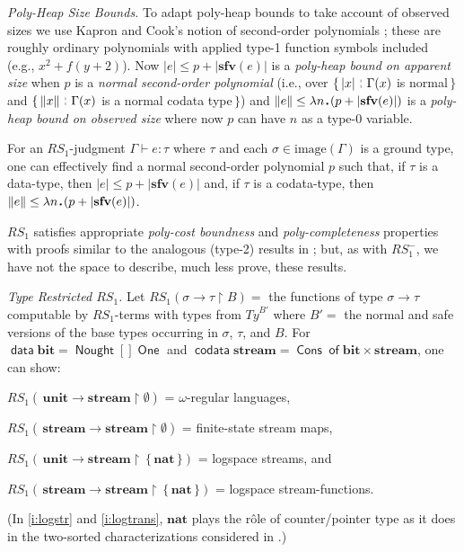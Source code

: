 \documentclass[envcountsame]{llncs}
\newcommand{\sfv}{\ensuremath{\mathbf{sfv}}}\newcommand{\ssize}[1]{\Vert #1\Vert}
\newcommand{\key}[1]{\ensuremath{\mathop{\mathsf{#1}}\nolimits}\xspace}
\newcommand{\Of}{\key{of}}
\newcommand{\type}[1]{\ensuremath{\mathbf{#1}}\xspace}
\newcommand{\Nat}{\type{nat}}
\newcommand{\Bit}{\type{bit}}
\newcommand{\Stream}{\type{stream}}
\newcommand{\Unit}{\ensuremath{\mathbf{unit}}\xspace}
\newcommand{\alt}{\mathrel{[\!]}}
\newcommand{\Ty}{\mathit{Ty}}
\newcommand{\constr}[1]{\ensuremath{\mathop{\mathsf{#1}}\nolimits}\xspace}
\newcommand{\Nought}{\constr{Nought}}
\newcommand{\One}{\constr{One}}
\newcommand{\data}{\constr{data}}
\newcommand{\codata}{\constr{codata}}
\newcommand{\Cons}{\constr{Cons}}
\newcommand{\asize}[1]{\ensuremath{\mathopen{|}#1\mathclose{|}}\xspace}
\newcommand{\osize}[1]{\ensuremath{\mathopen{\Vert}#1\mathclose{\Vert}}}
\newcommand{\RS}{\mathit{RS}}
\newcommand{\RSi}{\mathit{RS_1}}
\newcommand{\RSmi}{\mathit{RS^-_1}}
\newcommand{\confined}{\mathclose{\upharpoonright}}
\newcommand{\image}{\mathrm{image}}
\newcommand{\set}[1]{\{\,#1\,\}}
\newcommand{\entails}{\vdash}
\newcommand{\suchthat}{\mathrel{\,\stackrel{\rule{0.03em}{0.5ex}}{\rule[-.1ex]{0.03em}{0.5ex}}\,}}
\newcommand{\sqdot}{\rule{0.5mm}{0.5mm}}
\newcommand{\lam}[1]{\lambda #1\,\sqdot\,}
\newcommand{\of}{\colon}
\renewcommand{\colon}{\mathpunct{:}}
\begin{document}
 
\emph{Poly-Heap Size Bounds.} 
To adapt poly-heap bounds to take account of observed sizes we use
Kapron and Cook's notion of second-order polynomials
\cite{KapronCook:mach}; these are roughly ordinary polynomials with
applied type-1 function symbols included (e.g.,
$x^2+f(y+2)$).  Now $\asize{e} \leq p+\asize{\sfv(e)}$ 
is a \emph{poly-heap bound on apparent size} when $p$ is a 
\emph{normal second-order polynomial} 
(i.e., over $\{\,\asize{x} \suchthat \Gamma(x)$ is normal$\,\}$ 
and $\{\,\osize{x} \suchthat \Gamma(x)$ is a normal codata type$\,\}$)
and 
$\osize{e} \leq \lam{n}(p+\asize{\sfv(e)})$ 
is a \emph{poly-heap bound on observed size} where now $p$
can have $n$
as a type-0 variable.

\begin{theorem}[$\RSi$ Poly-Heap Size-Boundness] \label{t:RS:size}
  For an $\RSi$-judgment $\Gamma\entails e\of \tau$ where
  $\tau$ and each $\sigma\in\image(\Gamma)$ is a ground type, one
  can effectively find a normal second-order polynomial $p$ such
  that, if $\tau$ is a data-type, then $\asize{e} \leq p +
  \asize{\sfv(e)}$ and, if $\tau$ is a codata-type, then
  $\osize{e} \leq \lam{n}(p + \asize{\sfv(e)})$.
\end{theorem}

$\RSi$ satisfies appropriate \emph{poly-cost boundness}
and \emph{poly-completeness} properties with proofs similar to the
analogous (type-2) results in \cite{DR:ATS:LMCS,DannerRoyer:2algs};
but, as with $\RSmi$, we have not the space to describe, much less
prove, these results.

\emph{Type Restricted  $\RSi$.} 
Let $\RS_1(\sigma\to\tau\confined B) =$ the functions of type
$\sigma\to\tau$ computable by $\RS_1$-terms with types from
$\Ty^{B'}$ where $B'=$ the normal and safe versions of the base 
types occurring in $\sigma$, $\tau$, and $B$.
For
$\data \Bit = \Nought \alt \One$ and 
$\codata \Stream = \Cons\Of\Bit\times\Stream$,
one can show:
\begin{inparaenum}[\it (i)]
  \item 
$\RSi(\,\Unit\to\Stream\confined\emptyset)$ =
  	$\omega$-regular languages,
  \item 
$\RSi(\,\Stream\to\Stream\confined\emptyset)$ =
  	finite-state stream maps,
  \item \label{i:logstr}
$\RSi(\,\Unit\to\Stream\confined\,\set{\Nat})$ =
    logspace streams, and
  \item \label{i:logtrans}
$\RSi(\,\Stream\to\Stream\confined\,\set{\Nat})$ =
    logspace stream-functions.
\end{inparaenum}
(In \eqref{i:logstr} and \eqref{i:logtrans}, $\Nat$ plays the
r\^{o}le of counter/pointer type as it does in the two-sorted
characterizations considered in \cite{CookNguyen:book}.)
\end{document}
